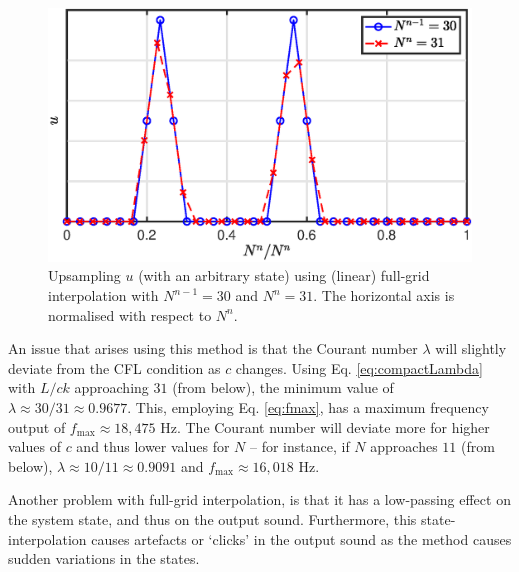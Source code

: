 \documentclass[dvipsnames, reprint]{JASA}
\begin{document}
\begin{figure}[h]
\includegraphics[width=\reprintcolumnwidth]{fullGrid}
\caption{\label{fig:fullGrid}{Upsampling $u$ (with an arbitrary state) using (linear) full-grid interpolation with $N^{n-1} = 30$ and $N^n = 31$. The horizontal axis is normalised with respect to $N^n$.}}
\end{figure} 

An issue that arises using this method is that the Courant number $\lambda$ will slightly deviate from the CFL condition as $c$ changes. Using Eq. \eqref{eq:compactLambda} with $L/ck$ approaching $31$ (from below), the minimum value of $\lambda \approx 30/31 \approx 0.9677$.
This, employing Eq. \eqref{eq:fmax}, has a maximum frequency output of $f_\text{max} \approx 18,475$ Hz. 
The Courant number will deviate more for higher values of $c$ and thus lower values for $N$ -- for instance, if $N$ approaches $11$ (from below), $\lambda \approx 10/11 \approx 0.9091$ and $f_\text{max} \approx 16,018$ Hz.

Another problem with full-grid interpolation, is that it has a low-passing effect on the system state, and thus on the output sound. %
Furthermore, this state-interpolation causes artefacts or `clicks' in the output sound as the method causes sudden variations in the states.  
\end{document}
